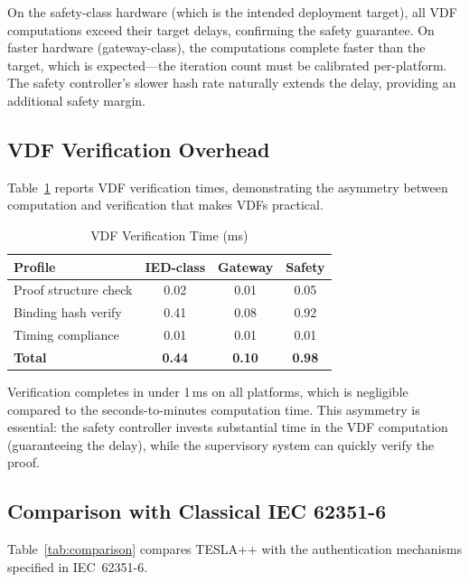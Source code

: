 \documentclass[conference,10pt]{IEEEtran}
\begin{document}
On the safety-class hardware (which is the intended deployment target), all VDF computations exceed their target delays, confirming the safety guarantee. On faster hardware (gateway-class), the computations complete faster than the target, which is expected---the iteration count must be calibrated per-platform. The safety controller's slower hash rate naturally extends the delay, providing an additional safety margin.

\subsection{VDF Verification Overhead}

Table~\ref{tab:vdf_verify} reports VDF verification times, demonstrating the asymmetry between computation and verification that makes VDFs practical.

\begin{table}[t]
\centering
\caption{VDF Verification Time (ms)}
\label{tab:vdf_verify}
\begin{tabular}{@{}lccc@{}}
\toprule
\textbf{Profile} & \textbf{IED-class} & \textbf{Gateway} & \textbf{Safety} \\
\midrule
Proof structure check & 0.02 & 0.01 & 0.05 \\
Binding hash verify   & 0.41 & 0.08 & 0.92 \\
Timing compliance     & 0.01 & 0.01 & 0.01 \\
\textbf{Total}        & \textbf{0.44} & \textbf{0.10} & \textbf{0.98} \\
\bottomrule
\end{tabular}
\end{table}

Verification completes in under 1\,ms on all platforms, which is negligible compared to the seconds-to-minutes computation time. This asymmetry is essential: the safety controller invests substantial time in the VDF computation (guaranteeing the delay), while the supervisory system can quickly verify the proof.

\subsection{Comparison with Classical IEC 62351-6}

Table~\ref{tab:comparison} compares TESLA++ with the authentication mechanisms specified in IEC~62351-6.
\end{document}

